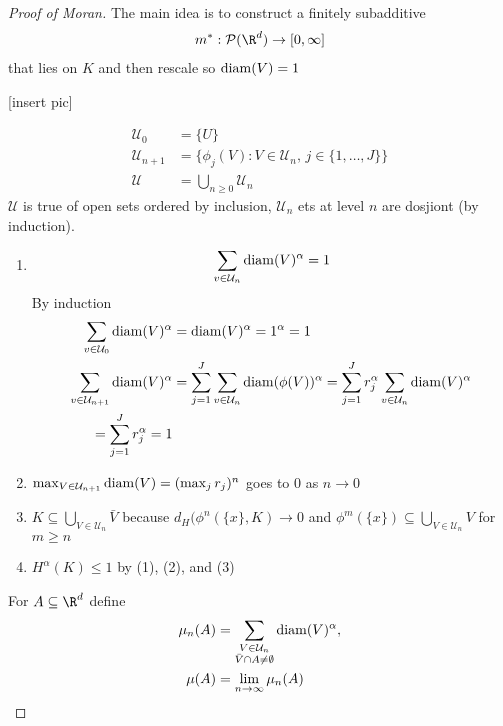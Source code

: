  \begin{proof}[Proof of Moran]
	 The main idea is to construct a finitely subadditive
	 \begin{align*}
		 m^{*} : \mathcal{P}(\R^{d}) \to [0, \infty]
	 \end{align*}
	 that lies on $K$ and then rescale so $\operatorname*{diam}(V) = 1$

	 [insert pic]

	 \begin{align*}
		 \mathcal{U}_0 &= \{U \} \\
		 \mathcal{U}_{n+1} &= \{\phi_{j} (V) : V \in \mathcal{U}_{n}, \, j \in \{1, \ldots , J \}\} \\
		 \mathcal{U} &= \bigcup_{n \geq 0} \mathcal{U}_{n}
	 \end{align*} 
$\mathcal{U}$ is true of open sets ordered by inclusion, $\mathcal{U}_{n}$ ets at level $n$ are dosjiont (by induction).

\begin{enumerate}
	\item
		\begin{align*}
			\sum_{v \in \mathcal{U}_n} \operatorname*{diam}(V)^{\alpha} = 1
		\end{align*} By induction 
		\begin{align*}
			\sum_{v \in \mathcal{U}_0} \operatorname*{diam}(V)^{\alpha} &= \operatorname*{diam}(V)^{\alpha} = 1^{\alpha} = 1 \\
			\sum_{v \in \mathcal{U}_{n+1}} \operatorname*{diam}(V)^{\alpha} &=
			\sum_{j=1}^{J} \sum_{v \in \mathcal{U}_n} \operatorname*{diam}(\phi(V))^{\alpha} = 
			\sum_{j=1}^{J} r_{j}^{\alpha} \sum_{v \in \mathcal{U}_n} \operatorname*{diam}(V)^{\alpha} \\
			= \sum_{j=1}^{J} r_{j}^{\alpha} = 1
		\end{align*}

	\item $\max_{V \in \mathcal{U}_{n+1}} \operatorname*{diam} (V) = (\max_{j} r_{j})^{n}$ goes to $0$ as $n \to 0$

	\item $K \subseteq \bigcup_{V \in \mathcal{U}_{n}} \bar{V}$ because $d_{H} ( \phi^{n}(\{x\}, K) \to 0$ and $\phi^{m}(\{x\}) \subseteq \bigcup_{V \in \mathcal{U}_{n}} V	$ for $m \geq n$

	\item $H^{\alpha} (K) \leq 1$ by (1), (2), and (3)
\end{enumerate}

For $A \subseteq \R^{d}$ define
\begin{align*}
	\mu_{n}(A) &= \sum_{\substack{V \in \mathcal{U}_n \\ \bar V \cap A \neq \emptyset}} \operatorname*{diam} (V)^{\alpha}, \\
	\mu (A) &= \lim_{n \to \infty} \mu_{n}(A)
\end{align*}


\end{proof}
